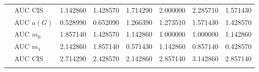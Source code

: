 \begin{table}[htbp]
\begin{tabular}{llrrrrrr}
    & AUC CIS & 1.142860 & 1.428570 & 1.714290 & 2.000000 & 2.285710 & 1.571430 \\
    \addlinespace
    \multirow{4}{*}{random} & AUC $a(G)$ & 0.528990 & 0.652090 & 1.266390 & 1.273510 & 1.571430 & 1.428570 \\
    & AUC $m_0$ & 1.857140 & 1.428570 & 1.142860 & 1.000000 & 1.000000 & 1.142860 \\
    & AUC $m_1$ & 2.142860 & 1.857140 & 0.571430 & 1.142860 & 0.857140 & 0.428570 \\
    & AUC CIS & 2.714290 & 2.428570 & 2.142860 & 2.857140 & 3.142860 & 2.857140 \\
    \addlinespace
    \bottomrule
  \end{tabular}
\end{table}

